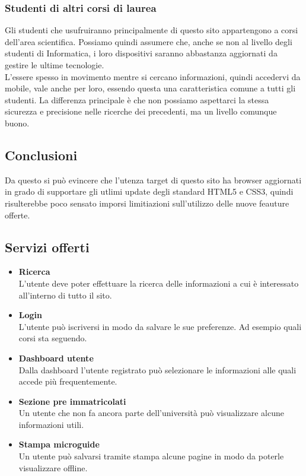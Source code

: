 \subsubsection{Studenti di altri corsi di laurea}
Gli studenti che usufruiranno principalmente di questo sito appartengono a corsi dell'area scientifica. Possiamo quindi assumere che, anche se non al livello degli studenti di Informatica, i loro dispositivi saranno abbastanza aggiornati da gestire le ultime tecnologie.\\
L'essere spesso in movimento mentre si cercano informazioni, quindi accedervi da mobile, vale anche per loro, essendo questa una caratteristica comune a tutti gli studenti. La differenza principale è che non possiamo aspettarci la stessa sicurezza e precisione nelle ricerche dei precedenti, ma un livello comunque buono.

\subsection{Conclusioni}
Da questo si può evincere che l'utenza target di questo sito ha browser aggiornati in grado di supportare gli utlimi update degli standard HTML5 e CSS3, quindi risulterebbe poco sensato imporsi limitiazioni sull'utilizzo delle nuove feauture offerte.

\subsection{Servizi offerti}
\begin{itemize}
    \item \textbf{Ricerca} \\ L'utente deve poter effettuare la ricerca delle informazioni a cui è interessato all'interno di tutto il sito.
    \item \textbf{Login} \\ L'utente può iscriversi in modo da salvare le sue preferenze. Ad esempio quali corsi sta seguendo.
    \item \textbf{Dashboard utente} \\ Dalla dashboard l'utente registrato può selezionare le informazioni alle quali accede più frequentemente.
    \item \textbf{Sezione pre immatricolati} \\ Un utente che non fa ancora parte dell'università può visualizzare alcune informazioni utili. %
    \item \textbf{Stampa microguide} \\ Un utente può salvarsi tramite stampa alcune pagine in modo da poterle visualizzare offline.
\end{itemize}
